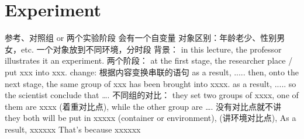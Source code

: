 \documentclass{ctexart}
\begin{document}
\section{Experiment}
\begin{outline}
    \1 参考、对照组 or 两个实验阶段
        \2 会有一个自变量
        \2 对象区别：年龄老少、性别男女，etc.
        \2 一个对象放到不同环境，分时段
    \1 背景：
        \2 in this lecture, the professor illustrates it an experiment.
    \1 两个阶段：
        \2 at the first stage, the researcher place / put xxx into xxx.
        \2 change: 根据内容变换串联的语句
        \2 as a result, .....
        \2 then, onto the next stage, the same group of xxx has been brought into xxxx.
        \2 as a result, .....
        \2 so the scientist conclude that \dots.
    \1 不同组的对比：
        \2 they set two groups of xxxx, one of them are xxxx (着重对比点), while the other group are \dots. 没有对比点就不讲
        \2 they both will be put in xxxxx (container or environment), (讲环境对比点),
        \2 As a result, xxxxxx
        \2 That's because xxxxxx

\end{outline}
\end{document}
